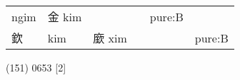 \documentclass[14pt,a4paper]{scrartcl}
\begin{document}
\begin{longtable}[c]{@{}llllll@{}}
\begin{minipage}[t]{0.14\columnwidth}
ngim
\strut\end{minipage} &
\begin{minipage}[t]{0.14\columnwidth}\raggedright\strut
金 kim
\strut\end{minipage} &
\begin{minipage}[t]{0.14\columnwidth}\raggedright\strut
\strut\end{minipage} &
\begin{minipage}[t]{0.14\columnwidth}\raggedright\strut
\strut\end{minipage} &
\begin{minipage}[t]{0.14\columnwidth}\raggedright\strut
pure:B
\strut\end{minipage}\tabularnewline
\begin{minipage}[t]{0.14\columnwidth}\raggedright\strut
欽
\strut\end{minipage} &
\begin{minipage}[t]{0.14\columnwidth}\raggedright\strut
kim
\strut\end{minipage} &
\begin{minipage}[t]{0.14\columnwidth}\raggedright\strut
廞 xim
\strut\end{minipage} &
\begin{minipage}[t]{0.14\columnwidth}\raggedright\strut
\strut\end{minipage} &
\begin{minipage}[t]{0.14\columnwidth}\raggedright\strut
\strut\end{minipage} &
\begin{minipage}[t]{0.14\columnwidth}\raggedright\strut
pure:B
\strut\end{minipage}\tabularnewline
\bottomrule
\end{longtable}

(151) 0653 {[}2{]}
\end{document}
